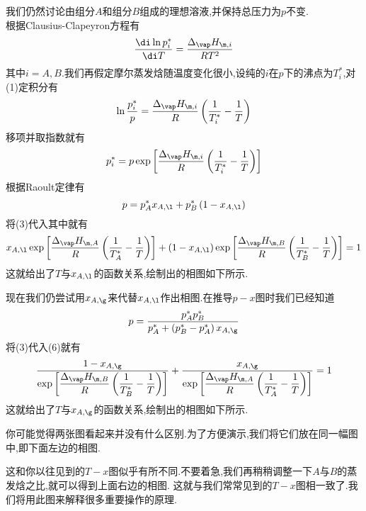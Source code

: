 \documentclass{ctexart}
\begin{document}
\begin{derivation}\setcounter{equation}{0}
    我们仍然讨论由组分$A$和组分$B$组成的理想溶液,并保持总压力为$p$不变.\\
    根据Clausius-Clapeyron方程有
    \begin{equation}
        \dfrac{\di\ln p_{i}^\ast}{\di T}=\dfrac{\Delta_\vap H_{\m,i}}{RT^2}
    \end{equation}
    其中$i=A,B$.我们再假定摩尔蒸发焓随温度变化很小,设纯的$i$在$p$下的沸点为$T_i^\ast$,对(1)定积分有
    \begin{equation}
        \ln\dfrac{p_i^\ast}{p}=\dfrac{\Delta_\vap H_{\m,i}}{R}\left(\dfrac{1}{T_i^\ast}-\dfrac1T\right)
    \end{equation}
    移项并取指数就有
    \begin{equation}
        p_i^\ast=p\exp{\left[\dfrac{\Delta_\vap H_{\m,i}}{R}\left(\dfrac{1}{T_i^\ast}-\dfrac1T\right)\right]}
    \end{equation}
    根据Raoult定律有
    \begin{equation}
        p=p_{A}^\ast x_{A,\l}+p_B^\ast\left(1-x_{A,\l}\right)
    \end{equation}
    将(3)代入其中就有
    \begin{equation}
        x_{A,\l}\exp{\left[\dfrac{\Delta_\vap H_{\m,A}}{R}\left(\dfrac{1}{T_A^\ast}-\dfrac1T\right)\right]}
        +\left(1-x_{A,\l}\right)\exp{\left[\dfrac{\Delta_\vap H_{\m,B}}{R}\left(\dfrac{1}{T_B^\ast}-\dfrac1T\right)\right]}=1
    \end{equation}
    这就给出了$T$与$x_{A,\l}$的函数关系,绘制出的相图如下所示.
    \begin{center}
        
    \end{center}
    现在我们仍尝试用$x_{A,\g}$来代替$x_{A,\l}$作出相图.在推导$p-x$图时我们已经知道
    \begin{equation}
        p=\dfrac{p_A^\ast p_B^\ast}{p_A^\ast+\left(p_B^\ast-p_A^\ast\right)x_{A,\g}}
    \end{equation}
    将(3)代入(6)就有
    \begin{equation}
        \dfrac{1-x_{A,\g}}{\exp{\left[\dfrac{\Delta_\vap H_{\m,B}}{R}\left(\dfrac{1}{T_B^\ast}-\dfrac1T\right)\right]}}+
        \dfrac{x_{A,\g}}{\exp{\left[\dfrac{\Delta_\vap H_{\m,A}}{R}\left(\dfrac{1}{T_A^\ast}-\dfrac1T\right)\right]}}=1
    \end{equation}
    这就给出了$T$与$x_{A,\g}$的函数关系,绘制出的相图如下所示.
    \begin{center}
        
    \end{center}
    你可能觉得两张图看起来并没有什么区别.为了方便演示,我们将它们放在同一幅图中,即下面左边的相图.
    \begin{center}
        
    \end{center}
    这和你以往见到的$T-x$图似乎有所不同.不要着急,我们再稍稍调整一下$A$与$B$的蒸发焓之比,就可以得到上面右边的相图.%
    这就与我们常常见到的$T-x$图相一致了\footnotemark.我们将用此图来解释很多重要操作的原理.
\end{derivation}
\end{document}
